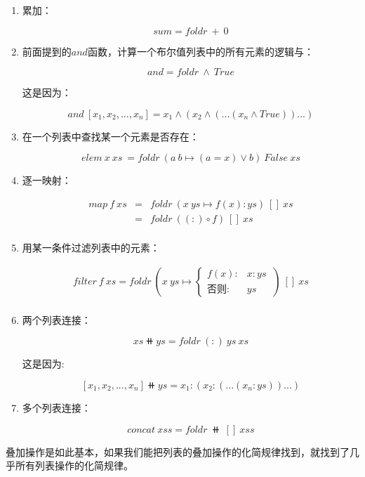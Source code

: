 \documentclass{article}
\begin{document}
\begin{enumerate}
\item 累加：

\[
sum = foldr\ +\ 0
\]

\item 前面提到的$and$函数，计算一个布尔值列表中的所有元素的逻辑与：

\[
and = foldr\ \land\ True
\]

这是因为：

\[
and\ [x_1, x_2, ..., x_n] = x_1 \land (x_2 \land (...(x_n \land True))...)
\]

\item 在一个列表中查找某一个元素是否存在：

\[
elem\ x\ xs\ = foldr\ (a\ b \mapsto (a = x) \lor b)\ False\ xs
\]

\item 逐一映射：

\[
\begin{array}{rcl}
map\ f\ xs & = & foldr\ (x\ ys \mapsto f(x) : ys)\ []\ xs \\
           & = & foldr\ ((:) \circ f)\ []\ xs \\
\end{array}
\]

\item 用某一条件过滤列表中的元素：

\[
\begin{array}{rl}
filter\ f\ xs = foldr\ (x\ ys \mapsto
  \begin{cases}
    f(x): & x:ys\ \\
    \text{否则}: & ys
  \end{cases})\ []\ xs \\
\end{array}
\]

\item 两个列表连接：

\[
xs \doubleplus ys = foldr\ (:)\ ys\ xs
\label{eq:binary-concat}
\]

这是因为:

\[
[x_1, x_2, ..., x_n] \doubleplus ys = x_1 : (x_2 : (...(x_n : ys))...)
\]

\item 多个列表连接：

\[
concat\ xss = foldr\ \doubleplus\ []\ xss
\]

\end{enumerate}

叠加操作是如此基本，如果我们能把列表的叠加操作的化简规律找到，就找到了几乎所有列表操作的化简规律。
\end{document}
